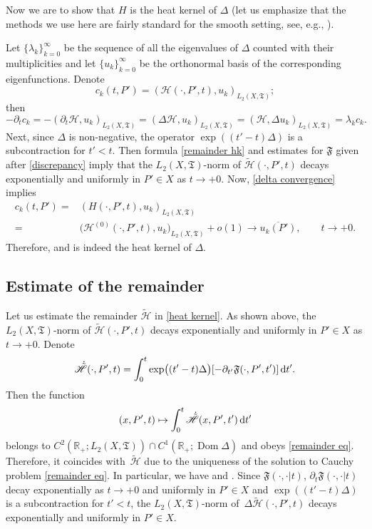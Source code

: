 \documentclass[pdftex]{sigma}
\numberwithin{equation}{section}
\theoremstyle{definition}
\begin{document}
Now we are to show that $H$ is the heat kernel of $\Delta$ (let us emphasize that the methods we use here are fairly standard for the smooth setting, see, e.g., \cite{BGV}).


 Let $\{\lambda_k\}_{k=0}^{\infty}$ be the sequence of all the eigenvalues of $\Delta$ counted with their multiplicities and let $\{u_k\}_{k=0}^{\infty}$ be the orthonormal basis of the corresponding eigenfunctions. Denote
\[c_k(t,P')=(\mathscr{H}(\cdot,P',t),u_k)_{L_2(X,\mathfrak{T})};\]
then
\[-\partial_t c_k=-(\partial_t\mathscr{H},u_k)_{L_2(X,\mathfrak{T})}=(\Delta\mathscr{H},u_k)_{L_2(X,\mathfrak{T})}=(\mathscr{H},\Delta u_k)_{L_2(X,\mathfrak{T})}=\lambda_k c_k.\]
Next, since $\Delta$ is non-negative, the operator $\exp((t'-t)\Delta)$ is a subcontraction for $t'<t$. Then formula \eqref{remainder hk} and estimates for $\mathfrak{F}$ given after \eqref{discrepancy} imply that the $L_2(X,\mathfrak{T})$-norm of $\tilde{\mathscr{H}}(\cdot,P',t)$ decays exponentially and uniformly in $P'\in X$ as $t\to +0$. Now, \eqref{delta convergence} implies
\begin{align*}
c_k(t,P')=&(H(\cdot,P',t),u_k)_{L_2(X,\mathfrak{T})}\\
=&\big(\mathscr{H}^{(0)}(\cdot,P',t),u_k\big)_{L_2(X,\mathfrak{T})}+o(1)\to \overline{u_k(P')}, \qquad t\to +0.
\end{align*}
Therefore,  and  is indeed the heat kernel of $\Delta$.

\subsection{Estimate of the remainder}
\label{hk asym rem ssec}
Let us estimate the remainder $\tilde{\mathscr{H}}$ in \eqref{heat kernel}. As shown above, the $L_2(X,\mathfrak{T})$-norm of $\tilde{\mathscr{H}}(\cdot,P',t)$ decays exponentially and uniformly in $P'\in X$ as $t\to +0$. Denote
\[\dot{\tilde{\mathscr{H}}}(\cdot,P',t)=\int_0^t\exp\bigl((t'-t)\Delta\bigr)[-\partial_{t'}\mathfrak{F}(\cdot,P',t')]\,{\rm d}t' .\]
Then the function
\[(x,P',t)\mapsto\int_0^t \dot{\tilde{\mathscr{H}}}(x,P',t')\, {\rm d}t'\] belongs to $C^{2}(\mathbb{R}_+;L_2(X,\mathfrak{T}))\cap C^{1}(\mathbb{R}_+;\operatorname{Dom}\Delta)$ and obeys \eqref{remainder eq}. Therefore, it coincides with~$\tilde{\mathscr{H}}$ due to the uniqueness of the solution to Cauchy problem \eqref{remainder eq}. In particular, we have  and
.
Since $\mathfrak{F}(\cdot,\cdot|t)$, $\partial_t\mathfrak{F}(\cdot,\cdot|t)$ decay exponentially as $t\to +0$ and uniformly in $P'\in X$ and $\exp((t'-t)\Delta)$ is a subcontraction for $t'<t$, the $L_2(X,\mathfrak{T})$-norm of~$\Delta\tilde{\mathscr{H}}(\cdot,P',t)$ decays exponentially and uniformly in $P'\in X$.
\end{document}
